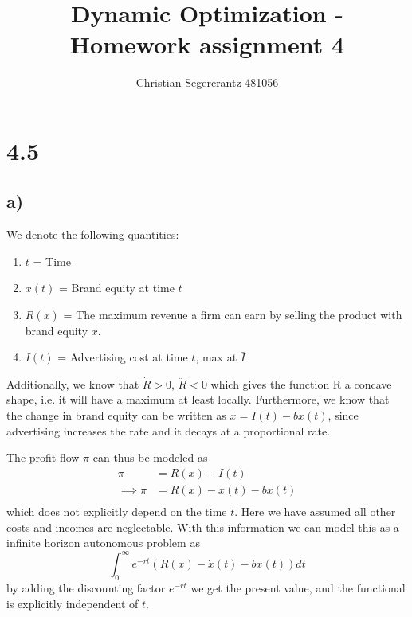 \documentclass{article}
\title{Dynamic Optimization - Homework assignment 4}
\author{Christian Segercrantz 481056}
\begin{document}
	\maketitle
	\pagebreak

\section*{4.5}

\subsection*{a)}

We denote the following quantities:
\begin{enumerate}
	\item $t$ = Time
	\item $x(t)$ = Brand equity at time $t$
	\item $R(x)$ = The maximum revenue a firm can earn by selling the
	product with brand equity $x$.
	\item $I(t)$ = Advertising cost at time $t$, max at $\bar{I}$
\end{enumerate}
Additionally, we know that $\dot{R} > 0$, $\ddot{R}<0$ which gives the function R a concave shape, i.e. it will have a maximum at least locally. Furthermore, we know that the change in brand equity can be written as $\dot{x} = I(t) - bx(t)$, since advertising increases the rate and it decays at a proportional rate.

The profit flow $\pi$ can thus be modeled as 
\begin{align}
	\pi &= R(x) - I(t)\\
	\implies \pi &= R(x) - \dot{x}(t) - bx(t)\\
\end{align}
which does not explicitly depend on the time $t$. Here we have assumed all other costs and incomes are neglectable. With this information we can model this as a infinite horizon autonomous problem as 
\begin{equation}
	\int_{0}^{\infty} e^{-rt}(R(x) - \dot{x}(t) - bx(t)) dt
\end{equation}
by adding the discounting factor $e^{-rt}$ we get the present value, and the functional is explicitly independent of $t$.
\end{document}
